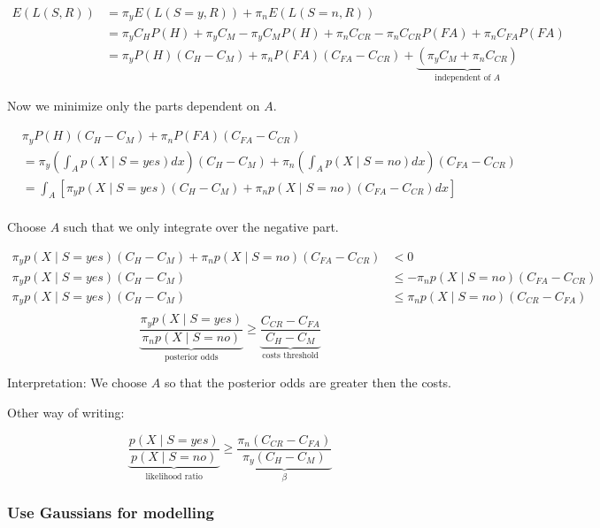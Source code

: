 \documentclass[../main/Notes.tex]{subfiles}
\begin{document}
\begin{align*}
E(L(S,R)) &= \pi_y  E(L(S=y, R)) + \pi_n E(L(S=n, R))\\
&= \pi_y C_H  P(H) + \pi_y C_M - \pi_y C_M P(H) + \pi_n C_{CR} - \pi_n C_{CR} P(FA) + \pi_n C_{FA} P(FA)\\
&= \pi_y P(H) (C_H - C_M) + \pi_n P(FA) (C_{FA} - C_{CR}) + \underbrace{(\pi_y C_M + \pi_n C_{CR})}_{\text{independent of } A} &
\end{align*}

Now we minimize only the parts dependent on $A$.

\begin{align*}
& \pi_y P(H) (C_H - C_M) + \pi_n P(FA) (C_{FA} - C_{CR})\\
&= \pi_y \left(\int_A p(X \mid S=yes) dx\right)(C_H - C_M) + \pi_n \left(\int_A p(X \mid S=no) dx\right) (C_{FA} - C_{CR})\\
&= \int_A \left[\pi_y p(X \mid S=yes)(C_H - C_M) + \pi_n p(X \mid S=no)(C_{FA} - C_{CR}) dx\right] & \\
\end{align*}

Choose $A$ such that we only integrate over the negative part.

\begin{align*}
\pi_y p(X \mid S=yes)(C_H - C_M) + \pi_n p(X \mid S=no)(C_{FA} - C_{CR}) &< 0 \\
\pi_y p(X \mid S=yes)(C_H - C_M) &\leq - \pi_n p(X \mid S=no)(C_{FA} - C_{CR}) \\
\pi_y p(X \mid S=yes)(C_H - C_M) &\leq \pi_n p(X \mid S=no)(C_{CR} - C_{FA}) \\
\end{align*}
\begin{equation*}
\underbrace{\frac{\pi_y p(X \mid S=yes)}{\pi_n p(X \mid S=no)}}_\text{posterior odds} \geq \underbrace{\frac{C_{CR} - C_{FA}}{C_H - C_M}}_\text{costs threshold}
\end{equation*}

Interpretation: We choose $A$ so that the posterior odds are greater then the costs.

Other way of writing:

\begin{equation*}
\underbrace{\frac{p(X \mid S=yes)}{p(X \mid S=no)}}_\text{likelihood ratio} \geq \underbrace{\frac{\pi_n(C_{CR} - C_{FA})}{\pi_y(C_H - C_M)}}_\beta
\end{equation*}


\subsubsection{Use Gaussians for modelling}
\end{document}
